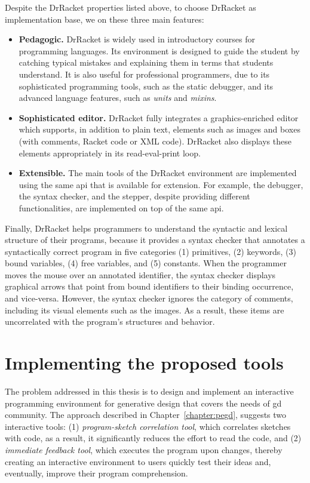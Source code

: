 Despite the DrRacket properties listed above, to choose DrRacket as implementation base, we on these three main features:

\begin{itemize}
    \item \textbf{Pedagogic.} DrRacket is widely used in introductory courses for programming languages. Its environment is designed to guide the student by catching typical mistakes and explaining them in terms that students understand. It is also useful for professional programmers, due to its sophisticated programming tools, such as the static debugger, and its advanced language features, such as \textit{units} and \textit{mixins}.

    \item \textbf{Sophisticated editor.} DrRacket fully integrates a graphics-enriched editor which supports, in addition to plain text, elements such as images and boxes (with comments, Racket code or XML code). DrRacket also displays these elements appropriately in its read-eval-print loop.

    \item \textbf{Extensible.} The main tools of the DrRacket environment are implemented using the same \gls{api} that is available for extension. For example, the debugger, the syntax checker, and the stepper, despite providing different functionalities, are implemented on top of the same \gls{api}.
\end{itemize}

Finally, DrRacket helps programmers to understand the syntactic and lexical structure of their programs, because it provides a syntax checker that annotates a syntactically correct program in five categories (1) primitives, (2) keywords, (3) bound variables, (4) free variables, and (5) constants. When the programmer moves the mouse over an annotated identifier, the syntax checker displays graphical arrows that point from bound identifiers to their binding occurrence, and vice-versa. However, the syntax checker ignores the category of comments, including its visual elements such as the images. As a result, these items are uncorrelated with the program's structures and behavior.

\section{Implementing the proposed tools}

The problem addressed in this thesis is to design and implement an interactive programming environment for generative design that covers the needs of \gls{gd} community. The approach described in Chapter~\ref{chapter:pegd}, suggests two interactive tools: (1) \textit{program-sketch correlation tool}, which correlates sketches with code, as a result, it significantly reduces the effort to read the code, and (2) \textit{immediate feedback tool}, which executes the program upon changes, thereby creating an interactive environment to users quickly test their ideas and, eventually, improve their program comprehension.

